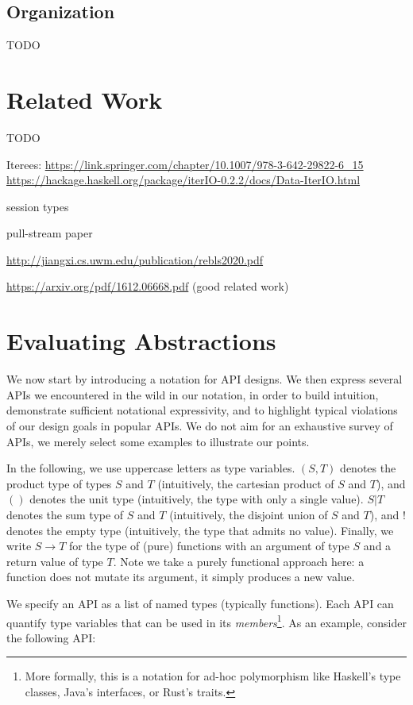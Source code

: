 \documentclass[sigplan,screen,10pt,anonymous,review]{acmart}
\begin{document}
\subsection{Organization}

TODO

\section{Related Work}\label{related_work}

TODO

Iterees: 
\url{https://link.springer.com/chapter/10.1007/978-3-642-29822-6_15}
\url{https://hackage.haskell.org/package/iterIO-0.2.2/docs/Data-IterIO.html}

session types

pull-stream paper

\url{http://jiangxi.cs.uwm.edu/publication/rebls2020.pdf}

\url{https://arxiv.org/pdf/1612.06668.pdf} (good related work)

\section{Evaluating Abstractions}\label{evaluating_others}

We now start by introducing a notation for API designs. We then express several APIs we encountered in the wild in our notation, in order to build intuition, demonstrate sufficient notational expressivity, and to highlight typical violations of our design goals in popular APIs. We do not aim for an exhaustive survey of APIs, we merely select some examples to illustrate our points.

In the following, we use uppercase letters as type variables. $(S, T)$ denotes the product type of types $S$ and $T$ (intuitively, the cartesian product of $S$ and $T$), and $()$ denotes the unit type (intuitively, the type with only a single value). $S | T$ denotes the sum type of $S$ and $T$ (intuitively, the disjoint union of $S$ and $T$), and $!$ denotes the empty type (intuitively, the type that admits no value). Finally, we write $S \rightarrow T$ for the type of (pure) functions with an argument of type $S$ and a return value of type $T$. Note we take a purely functional approach here: a function does not mutate its argument, it simply produces a new value.

We specify an API as a list of named types (typically functions). Each API can quantify type variables that can be used in its \textit{members}\footnote{More formally, this is a notation for ad-hoc polymorphism like Haskell's type classes, Java's interfaces, or Rust's traits.}. As an example, consider the following API:
\end{document}
